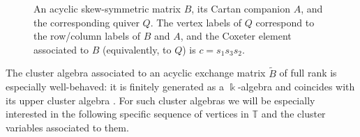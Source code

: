 \documentclass[12pt]{amsart}
\newcommand{\TT}{\mathbb{T}}
\newcommand{\kk}{\Bbbk}
\theoremstyle{remark}
\numberwithin{equation}{section}
\numberwithin{figure}{section}
\begin{document}
\begin{figure}%
  \centering
  \caption{
    An acyclic skew-symmetric matrix $B$, its Cartan companion $A$, and the corresponding quiver $Q$.
    The vertex labels of $Q$ correspond to the row/column labels of $B$ and $A$, and the Coxeter element associated to $B$ (equivalently, to $Q$) is $c = s_1 s_3 s_2$.
  }
  \label{fig:matrices}
\end{figure}  

The cluster algebra associated to an acyclic exchange matrix $\widetilde{B}$ of full rank is especially well-behaved: it is finitely generated as a $\kk$-algebra and coincides with its upper cluster algebra \cite{BFZ05}.
For such cluster algebras we will be especially interested in the following specific sequence of vertices in $\TT$ and the cluster variables associated to them.
\end{document}
